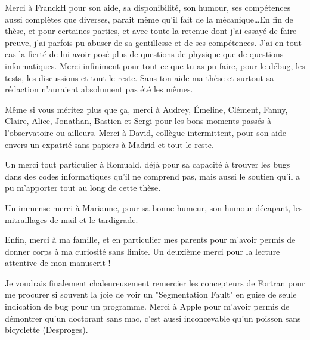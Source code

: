 Merci à FranckH pour son aide, sa disponibilité, son humour, ses compétences aussi complètes que diverses, parait même qu'il
fait de la mécanique\dots En fin de thèse, et pour certaines parties, et avec toute la retenue dont j'ai essayé de faire preuve,
j'ai parfois pu abuser de sa gentillesse et de ses compétences. J'ai en tout cas la fierté de lui avoir posé plus de questions
de physique que de questions informatiques. Merci infiniment pour tout ce que tu as pu faire, pour le débug, les tests, les
discussions et tout le reste. Sans ton aide ma thèse et surtout sa rédaction n'auraient absolument pas été les mêmes. 

\bigskip

Même si vous méritez plus que ça, merci à Audrey, Émeline, Clément, Fanny, Claire,
Alice, Jonathan, Bastien et
Sergi pour les bons moments passés à l'observatoire ou ailleurs. Merci à David, collègue intermittent, pour son 
aide envers un expatrié sans papiers à Madrid et tout le reste.

Un merci tout particulier à Romuald, déjà pour sa capacité à trouver les bugs dans des codes informatiques qu'il ne comprend
pas, mais aussi le soutien qu'il a pu m'apporter tout au long de cette thèse. 

Un immense merci à Marianne, pour sa bonne humeur, son humour décapant, les mitraillages de mail et le tardigrade. 

Enfin, merci à ma famille, et en particulier mes parents pour m'avoir permis de donner corps à ma curiosité sans limite. Un deuxième merci pour la lecture attentive de mon manuscrit !

Je voudrais finalement chaleureusement remercier les
concepteurs de Fortran pour me procurer si souvent la joie de voir un "Segmentation Fault" en guise de seule indication de bug
pour un programme. Merci à Apple pour m'avoir permis de démontrer qu'un doctorant sans mac, c'est aussi inconcevable qu'un
poisson sans bicyclette (\textcopyright Desproges). 

